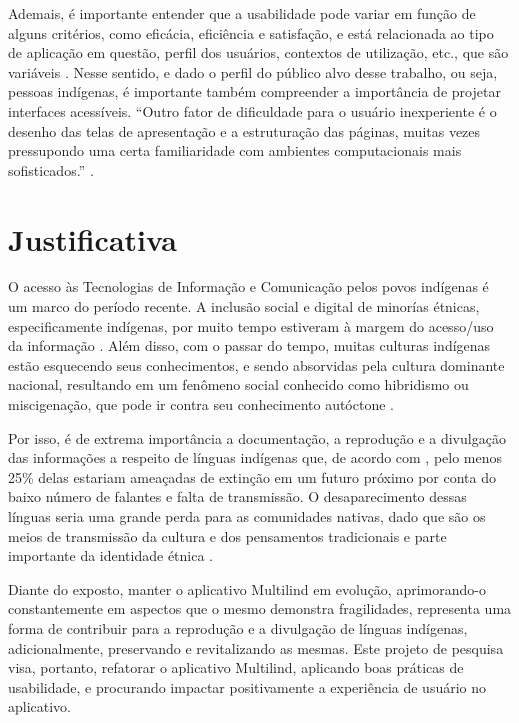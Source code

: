 Ademais, é importante entender que a usabilidade pode variar em função de alguns critérios, como eficácia, eficiência e satisfação, e está relacionada ao tipo de
aplicação em questão, perfil dos usuários, contextos de utilização, etc., que são variáveis \cite{winckler2022}. Nesse sentido, e dado o perfil do público alvo desse
trabalho, ou seja, pessoas indígenas, é importante também compreender a importância de projetar interfaces acessíveis. ``Outro fator de dificuldade para o usuário
inexperiente é o desenho das telas de apresentação e a estruturação das páginas, muitas vezes pressupondo uma certa familiaridade com ambientes computacionais mais
sofisticados.'' \cite{takashi2000}.

\section{Justificativa}
\label{sec:Justificativa}

O acesso às Tecnologias de Informação e Comunicação pelos povos indígenas é um marco do período recente. A inclusão social e digital de minorías étnicas, especificamente
indígenas, por muito tempo estiveram à margem do acesso/uso da informação \cite{pinto2010}. Além disso, com o passar do tempo, muitas culturas indígenas estão esquecendo
seus conhecimentos, e sendo absorvidas pela cultura dominante nacional, resultando em um fenômeno social conhecido como hibridismo ou miscigenação, que pode ir contra seu
conhecimento autóctone \cite{pinto2010}.

Por isso, é de extrema importância a documentação, a reprodução e a divulgação das informações a respeito de línguas indígenas que, de acordo com ,
pelo menos 25\% delas estariam ameaçadas de extinção em um futuro próximo por conta do baixo número de falantes e falta de transmissão. O desaparecimento dessas línguas
seria uma grande perda para as comunidades nativas, dado que são os meios de transmissão da cultura e dos pensamentos tradicionais e parte importante da identidade étnica
\cite{moore2008}.

Diante do exposto, manter o aplicativo Multilind em evolução, aprimorando-o constantemente em aspectos que o mesmo demonstra fragilidades, representa uma forma de
contribuir para a reprodução e a divulgação de línguas indígenas, adicionalmente, preservando e revitalizando as mesmas. Este projeto de pesquisa visa, portanto,
refatorar o aplicativo Multilind, aplicando boas práticas de usabilidade, e procurando impactar positivamente a experiência de usuário no aplicativo.

